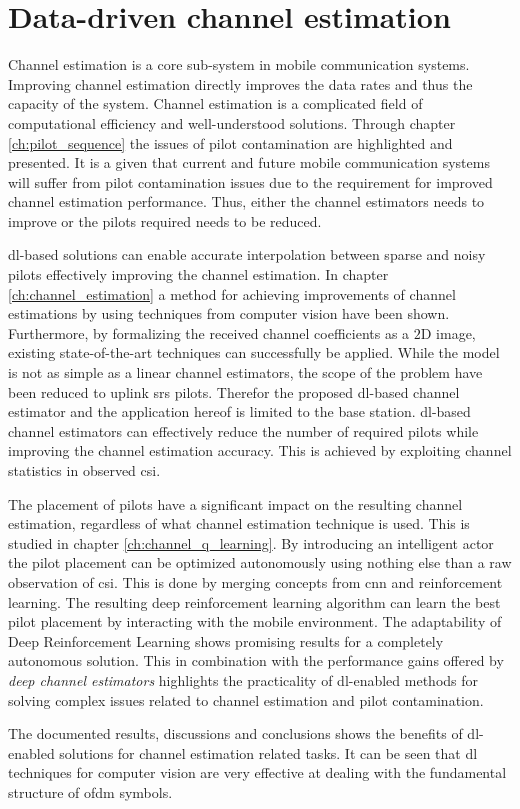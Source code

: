 \chapter{Data-driven channel estimation}

Channel estimation is a core sub-system in mobile communication systems. Improving channel estimation directly improves the data rates and thus the capacity of the system. Channel estimation is a complicated field of computational efficiency and well-understood solutions. Through chapter \ref{ch:pilot_sequence} the issues of pilot contamination are highlighted and presented. It is a given that current and future mobile communication systems will suffer from pilot contamination issues due to the requirement for improved channel estimation performance. Thus, either the channel estimators needs to improve or the pilots required needs to be reduced. 

\gls{dl}-based solutions can enable accurate interpolation between sparse and noisy pilots effectively improving the channel estimation. In chapter \ref{ch:channel_estimation} a method for achieving improvements of channel estimations by using techniques from computer vision have been shown. Furthermore, by formalizing the received channel coefficients as a $2$D image, existing state-of-the-art techniques can successfully be applied. While the model is not as simple as a linear channel estimators, the scope of the problem have been reduced to uplink \gls{srs} pilots. Therefor the proposed \gls{dl}-based channel estimator and the application hereof is limited to the base station.
\gls{dl}-based channel estimators can effectively reduce the number of required pilots while improving the channel estimation accuracy. This is achieved by exploiting channel statistics in observed \gls{csi}.


The placement of pilots have a significant impact on the resulting channel estimation, regardless of what channel estimation technique is used. This is studied in chapter \ref{ch:channel_q_learning}. By introducing an intelligent actor the pilot placement can be optimized autonomously using nothing else than a raw observation of \gls{csi}. This is done by merging concepts from \gls{cnn} and reinforcement learning. The resulting deep reinforcement learning algorithm can learn the best pilot placement by interacting with the mobile environment. The adaptability of Deep Reinforcement Learning shows promising results for a completely autonomous solution. This in combination with the performance gains offered by \emph{deep channel estimators} highlights the practicality of \gls{dl}-enabled methods for solving complex issues related to channel estimation and pilot contamination.

The documented results, discussions and conclusions shows the benefits of \gls{dl}-enabled solutions for channel estimation related tasks. It can be seen that \gls{dl} techniques for computer vision are very effective at dealing with the fundamental structure of \gls{ofdm} symbols.   
